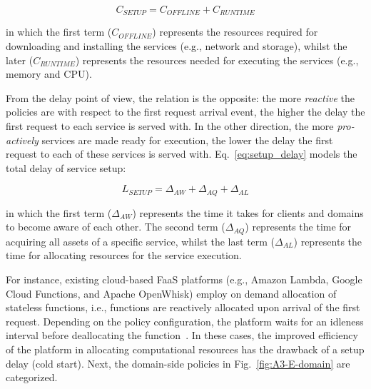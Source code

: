 \begin{equation}\label{eq:setup_cost}
C_{SETUP} = C_{OFFLINE} + C_{RUNTIME}
\end{equation}

\noindent
in which the first term ($C_{OFFLINE}$) represents the resources required for downloading and installing the services (e.g., network and storage), whilst the later ($C_{RUNTIME}$) represents the resources needed for executing the services (e.g., memory and CPU). 

From the delay point of view, the relation is the opposite: the more \textit{reactive} the policies are with respect to the first request arrival event, the higher the delay the first request to each service is served with. In the other direction, the more \textit{pro-actively} services are made ready for execution, the lower the delay the first request to each of these services is served with. Eq.~\ref{eq:setup_delay} models the total delay of service setup:

\begin{equation}\label{eq:setup_delay}
L_{SETUP} = \Delta_{AW} + \Delta_{AQ} + \Delta_{AL}
\end{equation}

\noindent
in which the first term ($\Delta_{AW}$) represents the time it takes for clients and domains to become aware of each other. The second term ($\Delta_{AQ}$) represents the time for acquiring all assets of a specific service, whilst the last term ($\Delta_{AL}$) represents the time for allocating resources for the service execution. 

For instance, existing cloud-based FaaS platforms (e.g., Amazon Lambda, Google Cloud Functions, and Apache OpenWhisk) employ on demand allocation of stateless functions, i.e., functions are reactively allocated upon arrival of the first request. Depending on the policy configuration, the platform waits for an idleness interval before deallocating the function~\cite{}. In these cases, the improved efficiency of the platform in allocating computational resources has the drawback of a setup delay (cold start). Next, the domain-side policies in Fig.~\ref{fig:A3-E-domain} are categorized.

